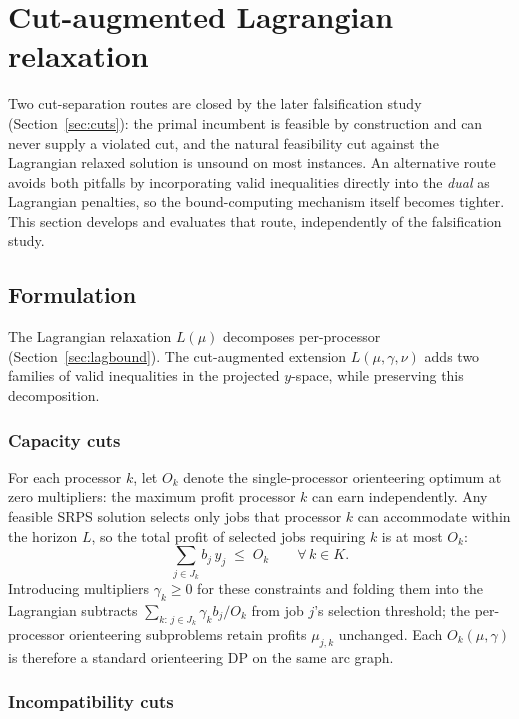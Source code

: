 \documentclass[11pt,a4paper]{article}
\begin{document}
\section{Cut-augmented Lagrangian relaxation}\label{sec:cutlr}

Two cut-separation routes are closed by the later falsification study
(Section~\ref{sec:cuts}): the primal incumbent is feasible by construction
and can never supply a violated cut, and the natural feasibility cut against
the Lagrangian relaxed solution is unsound on most instances.  An alternative
route avoids both pitfalls by incorporating valid inequalities directly into the
\emph{dual} as Lagrangian penalties, so the bound-computing mechanism itself
becomes tighter.  This section develops and evaluates that route, independently
of the falsification study.

\subsection{Formulation}\label{sec:cutlr-formulation}

The Lagrangian relaxation $L(\mu)$ decomposes per-processor (Section~\ref{sec:lagbound}).
The cut-augmented extension $L(\mu,\gamma,\nu)$ adds two families of valid inequalities
in the projected $y$-space, while preserving this decomposition.

\subsubsection{Capacity cuts}

For each processor $k$, let $O_k$ denote the single-processor orienteering optimum at
zero multipliers: the maximum profit processor $k$ can earn independently.  Any
feasible SRPS solution selects only jobs that processor $k$ can accommodate within the
horizon $L$, so the total profit of selected jobs requiring $k$ is at most $O_k$:
\begin{equation}\label{eq:cap-cut}
  \sum_{j \in J_k} b_j\, y_j \;\le\; O_k \qquad \forall\, k \in K.
\end{equation}
Introducing multipliers $\gamma_k \ge 0$ for these constraints and folding them into
the Lagrangian subtracts $\sum_{k:\,j\in J_k}\gamma_k b_j/O_k$ from job $j$'s
selection threshold; the per-processor orienteering subproblems retain profits
$\mu_{j,k}$ unchanged.  Each $O_k(\mu,\gamma)$ is therefore a standard orienteering
DP on the same arc graph.

\subsubsection{Incompatibility cuts}
\end{document}
